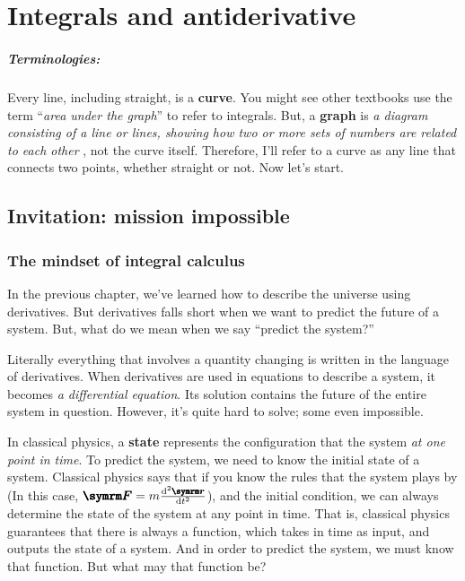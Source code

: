 \chapter{Integrals and antiderivative}
\label{sec:integrals}


\paragraph{Terminologies:} Every line, including straight, is a \textbf{curve}. You might see other textbooks use the term ``\emph{area under the graph}'' to refer to integrals. But, a \textbf{graph} is \textit{a diagram consisting of a line or lines, showing how two or more sets of numbers are related to each other} \cite{oxforddict}, not the curve itself. Therefore, I'll refer to a curve as any line that connects two points, whether straight or not. Now let's start.

\section{Invitation: mission impossible}

\subsection{The mindset of integral calculus}

In the previous chapter, we've learned how to describe the universe using derivatives. But derivatives falls short when we want to predict the future of a system. But, what do we mean when we say ``predict the system?''

Literally everything that involves a quantity changing is written in the language of derivatives. When derivatives are used in equations to describe a system, it becomes \emph{a differential equation}. Its solution contains the future of the entire system in question. However, it's quite hard to solve; some even impossible.

In classical physics, a \textbf{state} represents the configuration that the system \emph{at one point in time}. To predict the system, we need to know the initial state of a system. Classical physics says that if you know the rules that the system plays by (In this case, $\vv{F} = m\odv[ord = 2]{\vv{r}}{t}$), and the initial condition, we can always determine the state of the system at any point in time. That is, classical physics guarantees that there is always a function, which takes in time as input, and outputs the state of a system. And in order to predict the system, we must know that function. But what may that function be?

